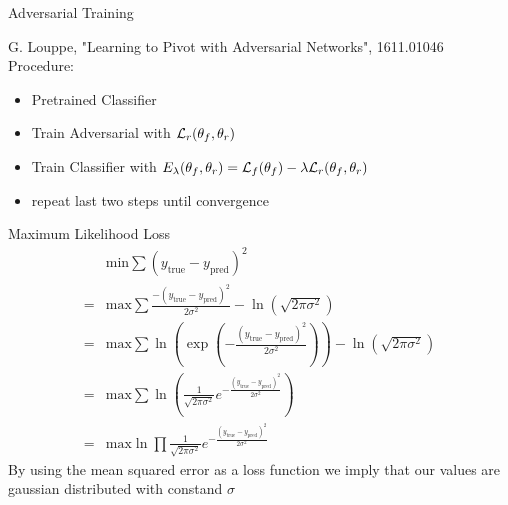 \documentclass[10pt]{beamer}
\begin{document}
\begin{frame}{Adversarial Training}

    \footnotesize{\color{gray} G. Louppe, "Learning to Pivot with Adversarial Networks", 1611.01046} \\
  Procedure:
  \begin{itemize}
  \item Pretrained Classifier
  \item Train Adversarial with  $ {\cal L}_r(\theta_f, \theta_r)$
  \item Train Classifier with $ E_\lambda(\theta_f, \theta_r) = {\cal L}_f(\theta_f) - \lambda {\cal L}_r(\theta_f, \theta_r)$ 
  \item repeat last two steps until convergence
  \end{itemize}

  \color{red}{$\Rightarrow$ no stable results}
  
\end{frame}

\begin{frame}{Maximum Likelihood Loss}
  \begin{align*}
    &\text{min} \sum (y_{\text{true}}-y_{\text{pred}})^2 \\
    =&\text{max} \sum\frac{-(y_{\text{true}}-y_{\text{pred}})^2}{2 \sigma^2} - \ln(\sqrt{2\pi \sigma^2}) \\
    = &\text{max} \sum \ln(\exp(-\frac{(y_{\text{true}}-y_{\text{pred}})^2}{2 \sigma^2})) - \ln(\sqrt{2\pi \sigma^2}) \\
    = &\text{max} \sum \ln( \frac{1}{\sqrt{2\pi \sigma^2}} e^{-\frac{(y_{\text{true}}-y_{\text{pred}})^2}{2 \sigma^2}}) \\
    = &\text{max} \ln \prod \frac{1}{\sqrt{2\pi \sigma^2}} e^{-\frac{(y_{\text{true}}-y_{\text{pred}})^2}{2 \sigma^2}}
  \end{align*}
    By using the mean squared error as a loss function we imply that our values are gaussian distributed with constand $\sigma$
\end{frame}
\end{document}
